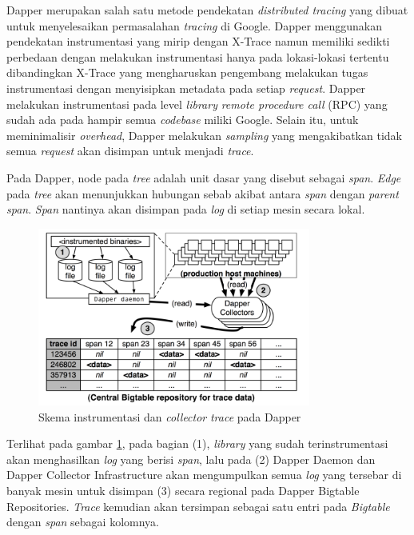 Dapper \citep{dapper-paper} merupakan salah satu metode pendekatan \textit{distributed tracing} yang dibuat untuk menyelesaikan permasalahan \textit{tracing} di Google. Dapper menggunakan pendekatan instrumentasi yang mirip dengan X-Trace namun memiliki sedikti perbedaan dengan melakukan instrumentasi hanya pada lokasi-lokasi tertentu dibandingkan X-Trace yang mengharuskan pengembang melakukan tugas instrumentasi dengan menyisipkan metadata pada setiap \textit{request}. Dapper melakukan instrumentasi pada level \textit{library} \textit{remote procedure call} (RPC) yang sudah ada pada hampir semua \textit{codebase} miliki Google. Selain itu, untuk meminimalisir \textit{overhead}, Dapper melakukan \textit{sampling} yang mengakibatkan tidak semua \textit{request} akan disimpan untuk menjadi \textit{trace}. 

Pada Dapper, node pada \textit{tree} adalah unit dasar yang disebut sebagai \textit{span}. \textit{Edge} pada \textit{tree} akan menunjukkan hubungan sebab akibat antara \textit{span} dengan \textit{parent span}. \textit{Span} nantinya akan disimpan pada \textit{log} di setiap mesin secara lokal. 
\begin{figure}[htb]
	\centering
	\includegraphics[width=0.8\textwidth]{resources/ch2/dapper-1.png}
	\caption{Skema instrumentasi dan \textit{collector} \textit{trace} pada Dapper \citep{dapper-paper}}
	\label{ch2-dapper-1}
\end{figure}

Terlihat pada gambar \ref{ch2-dapper-1}, pada bagian (1), \textit{library} yang sudah terinstrumentasi akan menghasilkan \textit{log} yang berisi \textit{span}, lalu pada (2) Dapper Daemon dan Dapper Collector Infrastructure akan mengumpulkan semua \textit{log} yang tersebar di banyak mesin untuk disimpan (3) secara regional pada Dapper Bigtable Repositories. \textit{Trace} kemudian akan tersimpan sebagai satu entri pada \textit{Bigtable} dengan \textit{span} sebagai kolomnya. 

